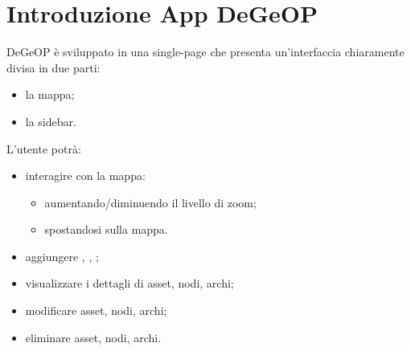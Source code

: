 \section{Introduzione App DeGeOP}
DeGeOP è sviluppato in una single-page che presenta un'interfaccia chiaramente divisa in due parti:
\begin{itemize}
	\item la mappa;
	\item la sidebar.
\end{itemize}
L'utente potrà:
\begin{itemize}
	\item interagire con la mappa:
	\begin{itemize}
		\item aumentando/diminuendo il livello di zoom;
		\item spostandosi sulla mappa.
	\end{itemize}
	\item aggiungere , , ;
	\item visualizzare i dettagli di asset, nodi, archi;
	\item modificare asset, nodi, archi;
	\item eliminare asset, nodi, archi.
\end{itemize}